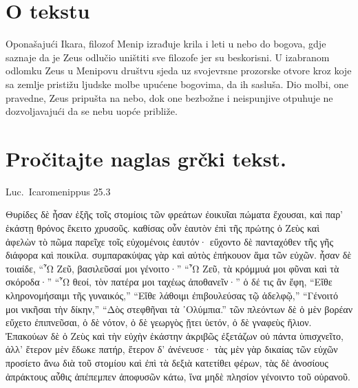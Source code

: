 


\section*{O tekstu}

Oponašajući Ikara, filozof Menip izrađuje krila i leti u nebo do bogova, gdje saznaje da je Zeus odlučio uništiti sve filozofe jer su beskorisni. U izabranom odlomku Zeus u Menipovu društvu sjeda uz svojevrsne prozorske otvore kroz koje sa zemlje pristižu ljudske molbe upućene bogovima, da ih sasluša. Dio molbi, one pravedne, Zeus pripušta na nebo, dok one bezbožne i neispunjive otpuhuje ne dozvoljavajući da se nebu uopće približe.


\section*{Pročitajte naglas grčki tekst.}

Luc.\ Icaromenippus 25.3

\medskip

{\large
\begin{greek}
\noindent Θυρίδες δὲ ἦσαν ἑξῆς τοῖς στομίοις τῶν φρεάτων ἐοικυῖαι πώματα ἔχουσαι, καὶ παρ' ἑκάστῃ θρόνος ἔκειτο χρυσοῦς. καθίσας οὖν ἑαυτὸν ἐπὶ τῆς πρώτης ὁ Ζεὺς καὶ ἀφελὼν τὸ πῶμα παρεῖχε τοῖς εὐχομένοις ἑαυτόν· εὔχοντο δὲ πανταχόθεν τῆς γῆς διάφορα καὶ ποικίλα. συμπαρακύψας γὰρ καὶ αὐτὸς ἐπήκουον ἅμα τῶν εὐχῶν. ἦσαν δὲ τοιαίδε, ``῏Ω Ζεῦ, βασιλεῦσαί μοι γένοιτο·'' ``῏Ω Ζεῦ, τὰ κρόμμυά μοι φῦναι καὶ τὰ σκόροδα·'' ``῏Ω θεοί, τὸν πατέρα μοι ταχέως ἀποθανεῖν·'' ὁ δέ τις ἂν ἔφη, ``Εἴθε κληρονομήσαιμι τῆς γυναικός,'' ``Εἴθε λάθοιμι ἐπιβουλεύσας τῷ ἀδελφῷ,'' ``Γένοιτό μοι νικῆσαι τὴν δίκην,'' ``Δὸς στεφθῆναι τὰ ᾿Ολύμπια.'' τῶν πλεόντων δὲ ὁ μὲν βορέαν εὔχετο ἐπιπνεῦσαι, ὁ δὲ νότον, ὁ δὲ γεωργὸς ᾔτει ὑετόν, ὁ δὲ γναφεὺς ἥλιον. Ἐπακούων δὲ ὁ Ζεὺς καὶ τὴν εὐχὴν ἑκάστην ἀκριβῶς ἐξετάζων οὐ πάντα ὑπισχνεῖτο, ἀλλ' ἕτερον μὲν ἔδωκε πατήρ, ἕτερον δ' ἀνένευσε· τὰς μὲν γὰρ δικαίας τῶν εὐχῶν προσίετο ἄνω διὰ τοῦ στομίου καὶ ἐπὶ τὰ δεξιὰ κατετίθει φέρων, τὰς δὲ ἀνοσίους ἀπράκτους αὖθις ἀπέπεμπεν ἀποφυσῶν κάτω, ἵνα μηδὲ πλησίον γένοιντο τοῦ οὐρανοῦ. 
\end{greek}

}

